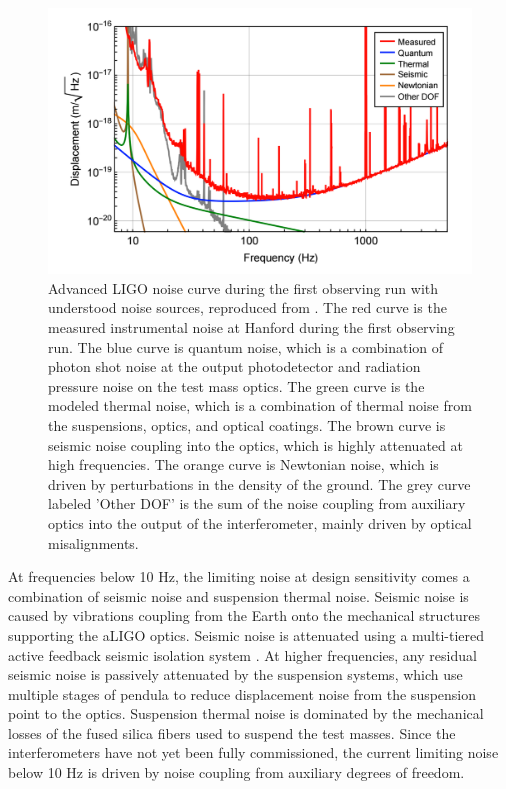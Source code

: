 \begin{figure}[ht!]
\includegraphics[width=\textwidth]{figures/introduction/noise-budget}
\caption[Advanced LIGO noise budget]{Advanced LIGO noise curve during the first %
         observing run with %
         understood noise sources, reproduced from \cite{GW150914-DETECTORS}. %
         The red curve is the measured instrumental noise at Hanford during the first %
         observing run. The blue curve is quantum noise, which is a combination of %
         photon shot noise at the output photodetector and radiation pressure noise %
         on the test mass optics. The green curve is the modeled thermal noise, which is a %
         combination of thermal noise from the suspensions, optics, and optical %
         coatings. The brown curve is seismic noise coupling into the optics, %
         which is highly attenuated at high frequencies. The orange curve is %
         Newtonian noise, which is driven by perturbations in the density of %
         the ground. The grey curve labeled 'Other DOF' is the sum of the %
         noise coupling from auxiliary optics into the output of the interferometer, %
         mainly driven by optical misalignments.
        }
\label{fig:noise-budget}
\end{figure}

At frequencies below 10 Hz, the limiting noise at design sensitivity 
comes a combination of seismic 
noise and suspension thermal noise. Seismic noise is caused by vibrations coupling 
from the Earth onto the mechanical structures supporting the aLIGO optics. 
Seismic noise is attenuated using 
a multi-tiered active feedback seismic isolation system \cite{SeiReview,HEPI}. At higher 
frequencies, any residual seismic noise is passively attenuated by the 
suspension systems, which use multiple stages of pendula to reduce displacement noise 
from the suspension point to the optics.
Suspension thermal noise is dominated by the mechanical losses of the fused 
silica fibers used to suspend the test masses. 
Since the interferometers have not yet been fully commissioned, the current 
limiting noise below 10 Hz is driven by noise coupling from auxiliary 
degrees of freedom.

